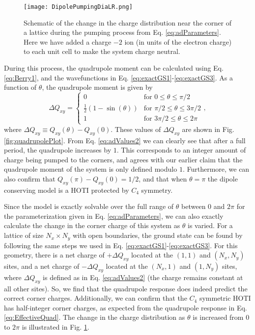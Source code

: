 \documentclass[prb,aps,twocolumn,groupaddress,floatfix]{revtex4-1}
\begin{document}
\begin{figure}\centering
\texttt{[image: DipolePumpingDiaLR.png]}
\caption{Schematic of the change in the charge distribution near the corner of a lattice during the pumping process from Eq. \ref{eq:adParameters}. Here we have added a charge $-2$ ion (in units of the electron charge) to each unit cell to make the system charge neutral. }\label{fig:DipolePumping}
\end{figure}


During this process, the quadrupole moment can be calculated using Eq. \ref{eq:Berry1}, and the wavefunctions in Eq. \ref{eq:exactGS1}-\ref{eq:exactGS3}. As a function of $\theta$, the quadrupole moment is given by
\begin{equation}
\Delta Q_{xy} = 
\begin{cases}
    0 & \text{for } 0 \leq \theta  \leq \pi/2\\
    \frac{1}{2}(1-\sin(\theta)) & \text{for } \pi/2 \leq \theta  \leq 3 \pi/2\\
    1 & \text{for } 3\pi/2 \leq \theta  \leq 2\pi
\end{cases},\label{eq:adValues2}
\end{equation}
where $\Delta Q_{xy}\equiv Q_{xy} (\theta ) - Q_{xy} (0)$. These values of $\Delta Q_{xy} $ are shown in Fig. \ref{fig:quadrupolePlot}. From Eq. \ref{eq:adValues2} we can clearly see that after a full period, the quadrupole increases by $1$. This corresponds to an integer amount of charge being pumped to the corners, and agrees with our earlier claim that the quadrupole moment of the system is only defined modulo $1$. Furthermore, we can also confirm that $Q_{xy} (\pi) - Q_{xy} (0) = 1/2$, and that when $\theta = \pi$ the dipole conserving model is a HOTI protected by $C_4$ symmetry.  

Since the model is exactly solvable over the full range of $\theta$ between $0$ and $2\pi$ for the parameterization given in Eq. \ref{eq:adParameters}, we can also exactly calculate the change in the corner charge of this system as $\theta$ is varied. For a lattice of size $N_x \times N_y$ with open boundaries, the ground state can be found by following the same steps we used in Eq. \ref{eq:exactGS1}-\ref{eq:exactGS3}. For this geometry, there is a net charge of $+\Delta Q_{xy}$ located at the $(1,1)$ and $(N_x,N_y)$ sites, and a net charge of $-\Delta Q_{xy}$ located at the $(N_x,1)$ and $(1,N_y)$ sites, where $\Delta Q_{xy}$ is defined as in Eq. \ref{eq:adValues2} (the charge remains constant at all other sites). So, we find that the quadrupole response does indeed predict the correct corner charges. Additionally, we can confirm that the $C_4$ symmetric HOTI has half-integer corner charges, as expected from the quadrupole response in Eq. \ref{eq:EffectiveQuad}. The change in the charge distribution as $\theta$ is increased from $0$ to $2\pi$ is illustrated in Fig. \ref{fig:DipolePumping}.
\end{document}
